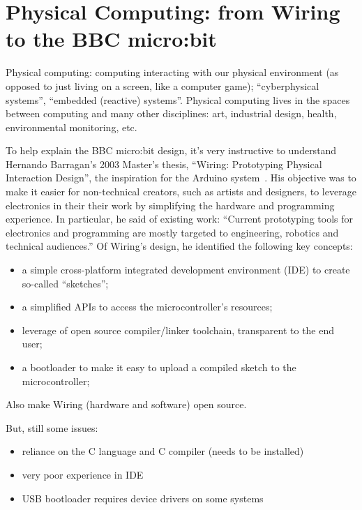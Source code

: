 \section{Physical Computing: from Wiring to the BBC micro:bit}
\label{sec:domain}

Physical computing: computing interacting with our physical environment (as opposed to just
living on a screen, like a computer game); ``cyberphysical systems'', ``embedded (reactive) systems''.
Physical computing lives in the spaces between computing and many other disciplines:
art, industrial design, health, environmental monitoring, etc.




To help explain the BBC micro:bit design, it's very instructive to understand
Hernando Barragan's 2003 Master's thesis, ``Wiring: Prototyping Physical Interaction Design'',
the inspiration for the Arduino system~\cite{Barragan}. His objective was to make it easier
for non-technical creators, such as artists and designers, to leverage
electronics in their their work by simplifying the hardware and programming
experience. In particular, he said of existing work:
``Current prototyping tools for electronics and programming are mostly targeted 
to engineering, robotics and technical audiences.''  
Of Wiring's design, he identified the following key concepts:
\begin{itemize}
\item a simple cross-platform integrated development environment (IDE) to create so-called ``sketches'';
\item a simplified APIs to access the microcontroller's resources;
\item leverage of open source compiler/linker toolchain, transparent to the end user;
\item a bootloader to make it easy to upload a compiled sketch to the microcontroller;
\end{itemize}
Also make Wiring (hardware and software) open source.

But, still some issues:
\begin{itemize}
    \item reliance on the C language and C compiler (needs to be installed)
    \item very poor experience in IDE
    \item USB bootloader requires device drivers on some systems
\end{itemize}

